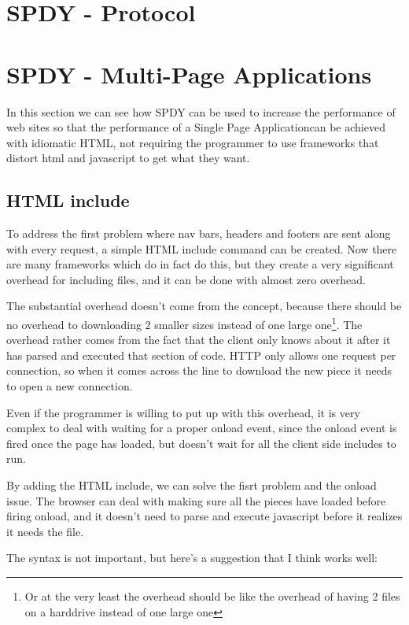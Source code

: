\documentclass{article}[10pt]
\newcommand{\spa}{Single Page Application}
\begin{document}
\section{SPDY - Protocol}

\section{SPDY - Multi-Page Applications}

In this section we can see how SPDY can be used to increase the performance of web sites so that the performance of a \spa can be achieved with idiomatic HTML, not requiring the programmer to use frameworks that distort html and javascript to get what they want.

\subsection{HTML include}

To address the first problem where nav bars, headers and footers are sent along with every request, a simple HTML include command can be created. Now there are many frameworks which do in fact do this, but they create a very significant overhead for including files, and it can be done with almost zero overhead.

The substantial overhead doesn't come from the concept, because there should be no overhead to downloading 2 smaller sizes instead of one large one\footnote{Or at the very least the overhead should be like the overhead of having 2 files on a harddrive instead of one large one}. The overhead rather comes from the fact that the client only knows about it after it has parsed and executed that section of code. HTTP only allows one request per connection, so when it comes across the line to download the new piece it needs to open a new connection.

Even if the programmer is willing to put up with this overhead, it is very complex to deal with waiting for a proper onload event, since the onload event is fired once the page has loaded, but doesn't wait for all the client side includes to run.

By adding the HTML include, we can solve the fisrt problem and the onload issue. The browser can deal with making sure all the pieces have loaded before firing onload, and it doesn't need to parse and execute javascript before it realizes it needs the file.

The syntax is not important, but here's a suggestion that I think works well:
\end{document}
